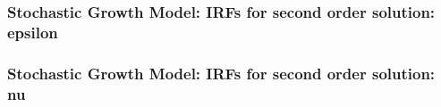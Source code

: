\documentclass[bigger,handout]{beamer}
\begin{document}
\begin{frame}
\frametitle{Stochastic Growth Model: IRFs for second order solution: epsilon}

\end{frame}

\begin{frame}
\frametitle{Stochastic Growth Model: IRFs for second order solution: nu}

\end{frame}
\end{document}
